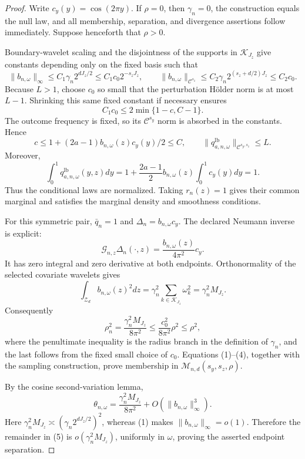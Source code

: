 \documentclass{article}
\begin{document}
\begin{proof}
Write \(c_y(y)=\cos(2\pi y)\).  If \(\rho=0\), then \(\gamma_n=0\), the construction equals the null law, and all membership, separation, and divergence assertions follow immediately.  Suppose henceforth that \(\rho>0\).

Boundary-wavelet scaling and the disjointness of the supports in \(\mathcal K_{J_z}\) give constants depending only on the fixed basis such that
\[
\|b_{n,\omega}\|_\infty
\le C_1\gamma_n2^{dJ_z/2}
\le C_1c_0 2^{-s_zJ_z},
\qquad
\|b_{n,\omega}\|_{\mathcal C^{s_z}}
\le C_2\gamma_n2^{(s_z+d/2)J_z}
\le C_2c_0.                                                               \tag{1}
\]
Because \(L>1\), choose \(c_0\) so small that the perturbation H\"older norm is at most \(L-1\).  Shrinking this same fixed constant if necessary ensures
\[
C_1c_0\le2\min\{1-c,C-1\}.
\]
The outcome frequency is fixed, so its \(\mathcal C^{s_y}\) norm is absorbed in the constants.  Hence
\[
c\le1+(2a-1)b_{n,\omega}(z)c_y(y)/2\le C,
\qquad
\|q_{a,n,\omega}^{\mathrm{lb}}\|_{\mathcal C^{s_y,s_z}}\le L.             \tag{2}
\]
Moreover,
\[
\int_0^1q_{a,n,\omega}^{\mathrm{lb}}(y,z)dy
=1+\frac{2a-1}{2}b_{n,\omega}(z)\int_0^1c_y(y)dy=1.                       \tag{3}
\]
Thus the conditional laws are normalized.  Taking \(r_n(z)=1\) gives their common marginal and satisfies the marginal density and smoothness conditions.

For this symmetric pair, \(\bar q_n=1\) and \(\Delta_n=b_{n,\omega}c_y\).  The declared Neumann inverse is explicit:
\[
\mathcal G_{n,z}\Delta_n(\cdot,z)
=\frac{b_{n,\omega}(z)}{4\pi^2}c_y.
\]
It has zero integral and zero derivative at both endpoints.  Orthonormality of the selected covariate wavelets gives
\[
\int_{\mathcal Z_d}b_{n,\omega}(z)^2dz
=\gamma_n^2\sum_{k\in\mathcal K_{J_z}}\omega_k^2
=\gamma_n^2M_{J_z}.
\]
Consequently
\[
\rho_n^2
=\frac{\gamma_n^2M_{J_z}}{8\pi^2}
\le\frac{c_0^2}{8\pi^2}\rho^2
\le\rho^2,                                                               \tag{4}
\]
where the penultimate inequality is the radius branch in the definition of \(\gamma_n\), and the last follows from the fixed small choice of \(c_0\).  Equations (1)--(4), together with the sampling construction, prove membership in \(\mathcal M_{n,d}(s_y,s_z,\rho)\).

By the cosine second-variation lemma,
\[
\theta_{n,\omega}
=\frac{\gamma_n^2M_{J_z}}{8\pi^2}+O(\|b_{n,\omega}\|_\infty^3).           \tag{5}
\]
Here \(\gamma_n^2M_{J_z}\asymp(\gamma_n2^{dJ_z/2})^2\), whereas (1) makes \(\|b_{n,\omega}\|_\infty=o(1)\).  Therefore the remainder in (5) is \(o(\gamma_n^2M_{J_z})\), uniformly in \(\omega\), proving the asserted endpoint separation.


\end{proof}
\end{document}
